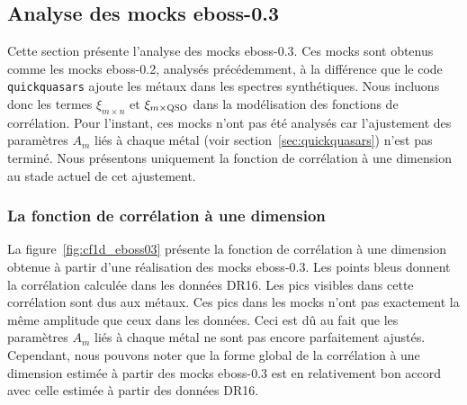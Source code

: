 \newpage
\subsection{Analyse des mocks eboss-0.3}
\label{subsec:ana_eboss-0.3}
Cette section présente l'analyse des mocks eboss-0.3. Ces mocks sont obtenus comme les mocks eboss-0.2, analysés précédemment, à la différence que le code \texttt{quickquasars} ajoute les métaux dans les spectres synthétiques. Nous incluons donc les termes $\xi_{m\times n}$ et $\xi_{m\times \textsc{QSO}}$ dans la modélisation des fonctions de corrélation.
Pour l'instant, ces mocks n'ont pas été analysés car l'ajustement des paramètres $A_m$ liés à chaque métal (voir section~\ref{sec:quickquasars}) n'est pas terminé. Nous présentons uniquement la fonction de corrélation à une dimension au stade actuel de cet ajustement.






\subsubsection{La fonction de corrélation à une dimension}
La figure~\ref{fig:cf1d_eboss03} présente la fonction de corrélation à une dimension obtenue à partir d'une réalisation des mocks eboss-0.3.
Les points bleus donnent la corrélation calculée dans les données DR16.
Les pics visibles dans cette corrélation sont dus aux métaux.
Ces pics dans les mocks n'ont pas exactement la même amplitude que ceux dans les données. Ceci est dû au fait que les paramètres $A_m$ liés à chaque métal ne sont pas encore parfaitement ajustés.
Cependant, nous pouvons noter que la forme global de la corrélation à une dimension estimée à partir des mocks eboss-0.3 est en relativement bon accord avec celle estimée à partir des données DR16.

